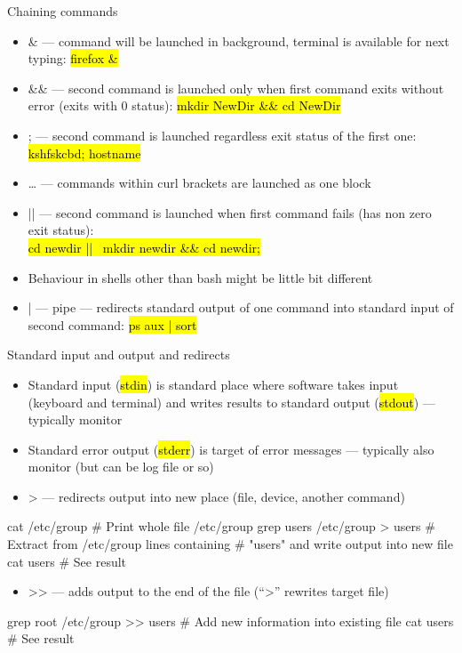 \documentclass[compress, ucs, xelatex, 11pt, xcolor=svgnames,
  hyperref={
    bookmarks=true,
    unicode=true,
    colorlinks=true,
    pdftitle={Linux, command line and MetaCentrum},
    plainpages=false,
    pdfauthor={Vojtech Zeisek},
    pdfsubject={Course about use of Linux command line, writing shell scripts and using MetaCentrum of CESNET},
    pdfcreator={XeLaTeX, http://www.xelatex.org/},
    pdfkeywords={Linux, GNU, BASH, shell, command line, MetaCentrum},
    linkcolor=Sienna,
    anchorcolor=black,
    citecolor=green,
    filecolor=magenta,
    menucolor=Sienna,
    urlcolor=cyan,
    pdftex},
  url={hyphens, lowtilde} %
  ]{beamer}
\renewcommand{\texttt}[1]{\hl{\ttfamily #1}}
\begin{document}
\begin{frame}{Chaining commands}
\begin{itemize}
  \item \alert{\&} --- command will be launched in background, terminal is available for next typing: \texttt{firefox \&}
  \item \alert{\&\&} --- second command is launched only when first command exits without error (exits with 0 status): \texttt{mkdir NewDir \&\& cd NewDir}
  \item \alert{;} --- second command is launched regardless exit status of the first one: \texttt{kshfskcbd; hostname}
  \item \alert{\textbraceleft\ldots\textbraceright} --- commands within curl brackets are launched as one block
  \item \alert{||} --- second command is launched when first command fails (has non zero exit status):\\\texttt{cd newdir || \textbraceleft~mkdir newdir \&\& cd newdir; \textbraceright}
  \item Behaviour in shells other than bash might be little bit different
  \item \alert{|} --- pipe --- redirects standard output of one command into standard input of second command: \texttt{ps aux | sort}
\end{itemize}
\end{frame}

\begin{frame}[fragile]{Standard input and output and redirects}
\begin{itemize}
  \item Standard input (\texttt{stdin}) is standard place where software takes input (keyboard and terminal) and writes results to standard output (\texttt{stdout}) --- typically monitor
  \item Standard error output (\texttt{stderr}) is target of error messages --- typically also monitor (but can be log file or so)
  \item \alert{\textgreater} --- redirects output into new place (file, device, another command)
\end{itemize}
  \begin{bashcode}
    cat /etc/group # Print whole file /etc/group
    grep users /etc/group > users # Extract from /etc/group lines containing
                                  # "users" and write output into new file
    cat users # See result
  \end{bashcode}
\begin{itemize}
  \item \alert{\textgreater\textgreater} --- adds output to the end of the file (``\textgreater'' rewrites target file)
\end{itemize}
  \begin{bashcode}
    grep root /etc/group >> users # Add new information into existing file
    cat users # See result
  \end{bashcode}
\end{frame}
\end{document}
